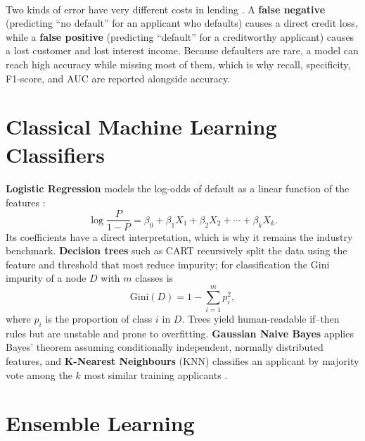 \documentclass[12pt,a4paper,final]{extreport}
\begin{document}
\paragraph{} Two kinds of error have very different costs in lending \cite{p2}. A \textbf{false negative} (predicting ``no default'' for an applicant who defaults) causes a direct credit loss, while a \textbf{false positive} (predicting ``default'' for a creditworthy applicant) causes a lost customer and lost interest income. Because defaulters are rare, a model can reach high accuracy while missing most of them, which is why recall, specificity, F1-score, and AUC are reported alongside accuracy.

\section{Classical Machine Learning Classifiers}

\paragraph{} \textbf{Logistic Regression} models the log-odds of default as a linear function of the features \cite{p3}:
\begin{equation}
\log\frac{P}{1-P}=\beta_0+\beta_1X_1+\beta_2X_2+\cdots+\beta_kX_k .
\end{equation}
Its coefficients have a direct interpretation, which is why it remains the industry benchmark. \textbf{Decision trees} such as CART recursively split the data using the feature and threshold that most reduce impurity; for classification the Gini impurity of a node $D$ with $m$ classes is
\begin{equation}
\mathrm{Gini}(D)=1-\sum_{i=1}^{m}p_i^{2},
\end{equation}
where $p_i$ is the proportion of class $i$ in $D$. Trees yield human-readable if--then rules but are unstable and prone to overfitting. \textbf{Gaussian Naive Bayes} applies Bayes' theorem assuming conditionally independent, normally distributed features, and \textbf{K-Nearest Neighbours} (KNN) classifies an applicant by majority vote among the $k$ most similar training applicants \cite{p2}.

\section{Ensemble Learning}
\end{document}
